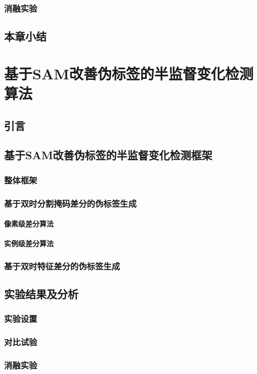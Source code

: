 \documentclass[lang=chs, degree=master, blindreview=false, adobe=false]{yanputhesis}
\begin{document}
\subsection{消融实验}
\section{本章小结}


\chapter{基于SAM改善伪标签的半监督变化检测算法}
\section{引言}
\section{基于SAM改善伪标签的半监督变化检测框架}
\subsection{整体框架}
\subsection{基于双时分割掩码差分的伪标签生成}
\subsubsection{像素级差分算法}
\subsubsection{实例级差分算法}
\subsection{基于双时特征差分的伪标签生成}
\section{实验结果及分析}
\subsection{实验设置}
\subsection{对比试验}
\subsection{消融实验}
\end{document}
